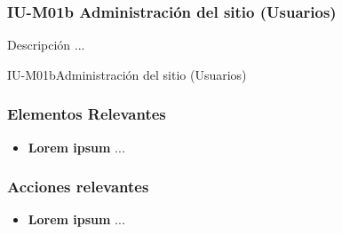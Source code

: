 
\subsubsection{IU-M01b Administración del sitio (Usuarios)}

 Descripción ...

        {IU-M01b}{Administración del sitio (Usuarios)}

\subsubsection{Elementos Relevantes}

    \begin{itemize}
    \item {\bf Lorem ipsum}
        ...
    \end{itemize}

\subsubsection{Acciones relevantes}

    \begin{itemize}
    \item {\bf Lorem ipsum}
        ...
    \end{itemize}

\clearpage
